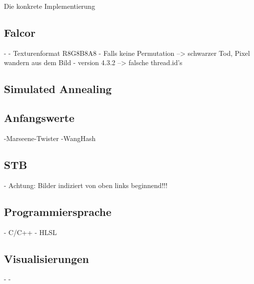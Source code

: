 Die konkrete Implementierung

\subsection{Falcor}
- \cite{Benty18}
- Texturenformat R8G8B8A8
- Falls keine Permutation --> schwarzer Tod, Pixel wandern aus dem Bild
- version 4.3.2 --> falsche thread.id's

\subsection{Simulated Annealing}


\subsection{Anfangswerte}
-Marseene-Twister
-WangHash

\subsection{STB}
- Achtung: Bilder indiziert von oben links beginnend!!!

\subsection{Programmiersprache}
- C/C++
- HLSL

\subsection{Visualisierungen}
- \cite{gnuplot} - \cite{matplotlibwrapper}